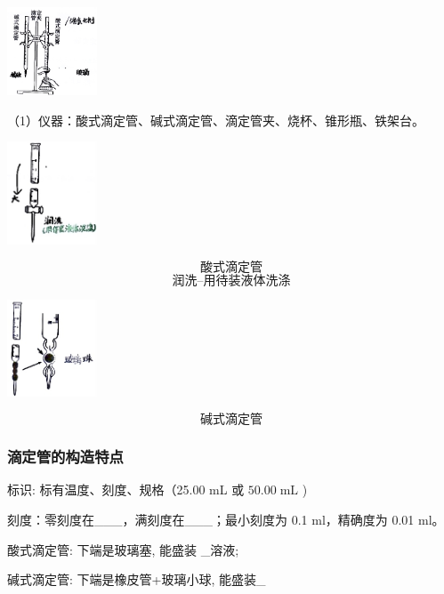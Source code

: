 \documentclass[10pt,cn]{elegantbook}
\begin{document}
	\begin{center}
		\includegraphics[max width=0.2\textwidth]{image/c2-1.jpg}
	\end{center}
	
	（1）仪器：酸式滴定管、碱式滴定管、滴定管夹、烧杯、锥形瓶、铁架台。
	
	\begin{center}
		\includegraphics[max width=0.2\textwidth]{image/c2-2.jpg}
	\end{center}
	\[\mbox{酸式滴定管}\]
		\[\mbox{润洗--用待装液体洗涤}\]
	\begin{center}
		\includegraphics[max width=0.2\textwidth]{image/c2-3.jpg}
	\end{center}
		\[\mbox{碱式滴定管}\]
	 
	
	\subsubsection{滴定管的构造特点}
	
		标识: 标有温度、刻度、规格（25.00 mL 或 \({50.00}\mathrm{\;{mL}}\) )%
	
	刻度：零刻度在\_\_\_，满刻度在\_\_\_；最小刻度为 0.1 ml，精确度为 0.01 ml。%
	
	酸式滴定管: 下端是玻璃塞, 能盛装 \_溶液;
	
	碱式滴定管: 下端是橡皮管+玻璃小球, 能盛装\_
	
	
	
\end{document}
